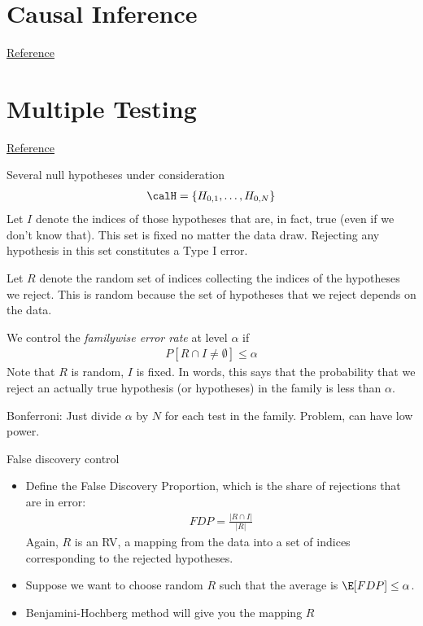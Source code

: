 \documentclass[12pt]{article}
\theoremstyle{plain}
\theoremstyle{definition}
\theoremstyle{remark}
\begin{document}
\clearpage
\section{Causal Inference}

\href{http://www.stat.cmu.edu/~larry/=stat705/Lecture17.pdf}{Reference}



\clearpage
\section{Multiple Testing}

\href{http://www.stat.cmu.edu/~larry/=stat705/Lecture18.pdf}{Reference}

Several null hypotheses under consideration
\begin{align*}
  \calH = \{H_{0,1},\ldots,H_{0,N}\}
\end{align*}
Let $I$ denote the indices of those hypotheses that are, in fact, true
(even if we don't know that).
This set is fixed no matter the data draw.
Rejecting any hypothesis in this set constitutes a Type I error.

Let $R$ denote the random set of indices collecting the indices of the
hypotheses we reject. This is random because the set of hypotheses that
we reject depends on the data.

We control the \emph{familywise error rate} at level $\alpha$ if
\begin{align*}
  P[R \cap I \neq \emptyset]\leq \alpha
\end{align*}
Note that $R$ is random, $I$ is fixed.
In words, this says that the probability that we reject an actually true
hypothesis (or hypotheses) in the family is less than $\alpha$.

Bonferroni:
Just divide $\alpha$ by $N$ for each test in the family.
Problem, can have low power.

False discovery control
\begin{itemize}
  \item Define the False Discovery Proportion,
    which is the share of rejections that are in error:
    \begin{align*}
      FDP
      =
      \frac{|R\cap I|}{|R|}
    \end{align*}
    Again, $R$ is an RV, a mapping from the data into a set of indices
    corresponding to the rejected hypotheses.
  \item Suppose we want to choose random $R$ such that the average is
    $\E[FDP]\leq \alpha$.
  \item Benjamini-Hochberg method will give you the mapping $R$

\end{itemize}
\end{document}
